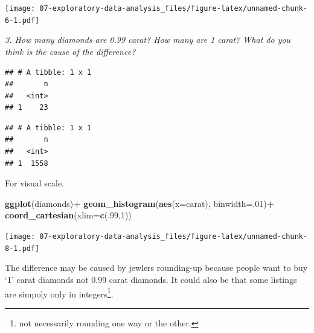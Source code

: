 \documentclass[]{book}
\newenvironment{Shaded}{\begin{snugshade}}{\end{snugshade}}
\newcommand{\DataTypeTok}[1]{\textcolor[rgb]{0.13,0.29,0.53}{#1}}
\newcommand{\DecValTok}[1]{\textcolor[rgb]{0.00,0.00,0.81}{#1}}
\newcommand{\FloatTok}[1]{\textcolor[rgb]{0.00,0.00,0.81}{#1}}
\newcommand{\KeywordTok}[1]{\textcolor[rgb]{0.13,0.29,0.53}{\textbf{#1}}}
\newcommand{\NormalTok}[1]{#1}
\newcommand{\OperatorTok}[1]{\textcolor[rgb]{0.81,0.36,0.00}{\textbf{#1}}}
\newcommand{\StringTok}[1]{\textcolor[rgb]{0.31,0.60,0.02}{#1}}
\let\rmarkdownfootnote\footnote%
\def\footnote{\protect\rmarkdownfootnote}
\theoremstyle{definition}
\theoremstyle{definition}
\theoremstyle{definition}
\theoremstyle{remark}
\begin{document}
\texttt{[image: 07-exploratory-data-analysis\_files/figure-latex/unnamed-chunk-6-1.pdf]}

\emph{3. How many diamonds are 0.99 carat? How many are 1 carat? What do
you think is the cause of the difference?}

\begin{Shaded}
\end{Shaded}

\begin{verbatim}
## # A tibble: 1 x 1
##       n
##   <int>
## 1    23
\end{verbatim}

\begin{Shaded}
\end{Shaded}

\begin{verbatim}
## # A tibble: 1 x 1
##       n
##   <int>
## 1  1558
\end{verbatim}

For visual scale.

\begin{Shaded}
\begin{Highlighting}[]
\KeywordTok{ggplot}\NormalTok{(diamonds)}\OperatorTok{+}
\StringTok{  }\KeywordTok{geom_histogram}\NormalTok{(}\KeywordTok{aes}\NormalTok{(}\DataTypeTok{x=}\NormalTok{carat), }\DataTypeTok{binwidth=}\NormalTok{.}\DecValTok{01}\NormalTok{)}\OperatorTok{+}
\StringTok{  }\KeywordTok{coord_cartesian}\NormalTok{(}\DataTypeTok{xlim=}\KeywordTok{c}\NormalTok{(.}\DecValTok{99}\NormalTok{,}\DecValTok{1}\NormalTok{))}
\end{Highlighting}
\end{Shaded}

\texttt{[image: 07-exploratory-data-analysis\_files/figure-latex/unnamed-chunk-8-1.pdf]}

The difference may be caused by jewlers rounding-up because people want
to buy `1' carat diamonds not 0.99 carat diamonds. It could also be that
some listings are simpoly only in integers\footnote{not necessarily
  rounding one way or the other.}.
\end{document}
